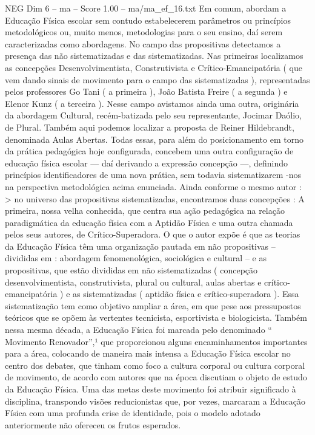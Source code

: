 \begin{textsample}{NEG Dim 6 – ma – Score 1.00 – ma/ma\_ef\_16.txt}
Em comum, abordam a Educação Física escolar sem contudo estabelecerem parâmetros ou princípios metodológicos ou, muito menos, metodologias para o seu ensino, daí serem caracterizadas como abordagens.
No campo das propositivas detectamos a presença das não sistematizadas e das sistematizadas.
Nas primeiras localizamos as concepções Desenvolvimentista, Construtivista e Crítico-Emancipatória ( que vem dando sinais de movimento para o campo das sistematizadas ), representadas pelos professores Go Tani ( a primeira ), João Batista Freire ( a segunda ) e Elenor Kunz ( a terceira ).
Nesse campo avistamos ainda uma outra, originária da abordagem Cultural, recém-batizada pelo seu representante, Jocimar Daólio, de Plural.
Também aqui podemos localizar a proposta de Reiner Hildebrandt, denominada Aulas Abertas.
Todas essas, para além do posicionamento em torno da prática pedagógica hoje configurada, concebem uma outra configuração de educação física escolar — daí derivando a expressão concepção —, definindo princípios identificadores de uma nova prática, sem todavia sistematizarem -nos na perspectiva metodológica acima enunciada.
Ainda conforme o mesmo autor : > no universo das propositivas sistematizadas, encontramos duas concepções : A primeira, nossa velha conhecida, que centra sua ação pedagógica na relação paradigmática da educação física com a Aptidão Física e uma outra chamada pelos seus autores, de Crítico-Superadora.
O que o autor expõe é que as teorias da Educação Física têm uma organização pautada em não propositivas – divididas em : abordagem fenomenológica, sociológica e cultural – e as propositivas, que estão divididas em não sistematizadas ( concepção desenvolvimentista, construtivista, plural ou cultural, aulas abertas e crítico-emancipatória ) e as sistematizadas ( aptidão física e crítico-superadora ).
Essa sistematização tem como objetivo ampliar a área, em que pese aos pressupostos teóricos que se opõem às vertentes tecnicista, esportivista e biologicista.
Também nessa mesma década, a Educação Física foi marcada pelo denominado “ Movimento Renovador”,¹ que proporcionou alguns encaminhamentos importantes para a área, colocando de maneira mais intensa a Educação Física escolar no centro dos debates, que tinham como foco a cultura corporal ou cultura corporal de movimento, de acordo com autores que na época discutiam o objeto de estudo da Educação Física.
Uma das metas deste movimento foi atribuir significado à disciplina, transpondo visões reducionistas que, por vezes, marcaram a Educação Física com uma profunda crise de identidade, pois o modelo adotado anteriormente não ofereceu os frutos esperados.

\end{textsample}
